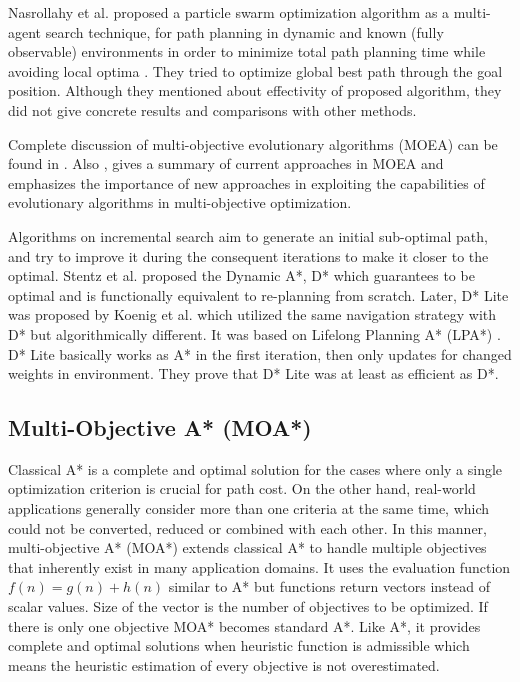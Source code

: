 \documentclass[10pt,journal]{IEEEtran}
\begin{document}
Nasrollahy et al. proposed a particle swarm optimization algorithm as a multi-agent search technique, for path planning in dynamic and known (fully observable) environments in order to minimize total path planning time while avoiding local optima \cite{Nasrollahy:2009}.
They tried to optimize global best path through the goal position. Although they mentioned about effectivity of proposed algorithm, they did not give concrete results and comparisons with other methods.


Complete discussion of multi-objective evolutionary algorithms (MOEA) can be found in \cite{MOOUEA}. Also \cite{Coello:2000}, gives a summary of current approaches in MOEA and emphasizes the importance of new approaches in exploiting the capabilities of evolutionary algorithms in multi-objective optimization.

Algorithms on incremental search aim to generate an initial sub-optimal path, and try to improve it during the consequent iterations to make it closer to the optimal. Stentz et al. proposed the Dynamic A*, D* \cite{DStar:1994} which guarantees to be optimal and is functionally equivalent to re-planning from scratch. Later, D* Lite was proposed by Koenig et al. \cite{Koenig:2002} which utilized the same navigation strategy with D* but algorithmically different. It was based on Lifelong Planning A* (LPA*) \cite{LPAStarKoenig:2004}. D* Lite basically works as A* in the first iteration, then only updates for changed weights in environment. They prove that D* Lite was at least as efficient as D*.

\subsection{Multi-Objective A* (MOA*)}

Classical A* \cite{AStarHart:1968} is a complete and optimal solution for the cases where only a single optimization criterion is crucial for path cost. On the other hand, real-world applications generally consider more than one criteria at the same time, which could not be converted, reduced or combined with each other. In this manner, multi-objective A* (MOA*) \cite{MOAStewart:1991} extends classical A* to handle multiple objectives that inherently exist in many application domains. It uses the evaluation function $f(n) = g(n) + h(n)$ similar to A* but functions return vectors instead of scalar values. Size of the vector is the number of objectives to be optimized. If there is only one objective MOA* becomes standard A*. Like A*, it provides complete and optimal solutions when heuristic function is admissible which means the heuristic estimation of every objective is not overestimated.
\end{document}
